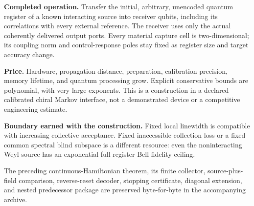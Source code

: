 \documentclass[11pt,a4paper]{article}
\begin{document}
\hypersetup{pageanchor=false}
\begin{titlepage}
\vspace{10mm}{\huge\bfseries Bounded-component acquisition\newline of an unknown many-body\newline quantum register\par}
\vspace{7mm}{\Large Continuous fields, two-level receivers,\newline fixed local response, and an explicit decoder\par}
\vspace{9mm}{\large 5 November 2026, Australia/Brisbane\par}
\vspace{11mm}
\textbf{Completed operation.} Transfer the initial, arbitrary, unencoded quantum register of a known interacting source into receiver qubits, including its correlations with every external reference. The receiver uses only the actual coherently delivered output ports. Every material capture cell is two-dimensional; its coupling norm and control-response poles stay fixed as register size and target accuracy change.

\textbf{Price.} Hardware, propagation distance, preparation, calibration precision, memory lifetime, and quantum processing grow. Explicit conservative bounds are polynomial, with very large exponents. This is a construction in a declared calibrated chiral Markov interface, not a demonstrated device or a competitive engineering estimate.

\textbf{Boundary earned with the construction.} Fixed local linewidth is compatible with increasing collective acceptance. Fixed inaccessible collection loss or a fixed common spectral blind subspace is a different resource: even the noninteracting Weyl source has an exponential full-register Bell-fidelity ceiling.

\vfill The preceding continuous-Hamiltonian theorem, its finite collector, source-plus-field comparison, reverse-reset decoder, stopping certificate, diagonal extension, and nested predecessor package are preserved byte-for-byte in the accompanying archive.
\end{titlepage}
\hypersetup{pageanchor=true}
\end{document}
